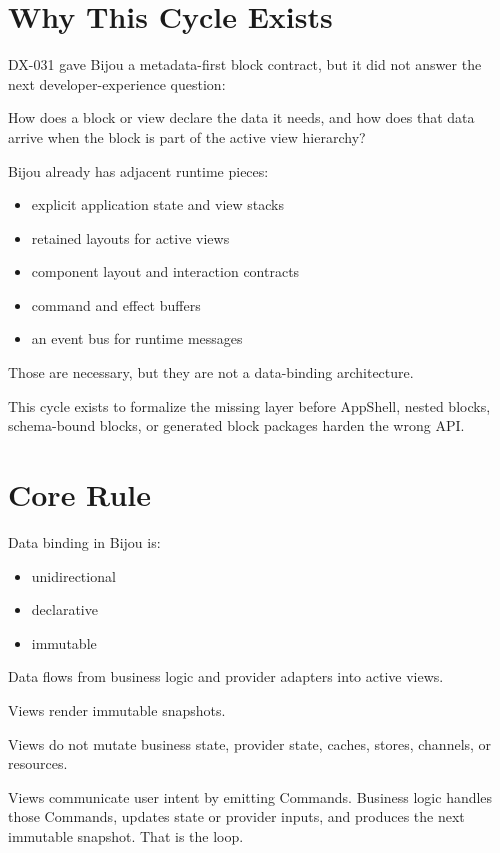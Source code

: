 \section{Why This Cycle Exists}\label{record-132-why-this-cycle-exists}

DX-031 gave Bijou a metadata-first block contract, but it did not answer the next developer-experience question:

How does a block or view declare the data it needs, and how does that data arrive when the block is part of the active view hierarchy?

Bijou already has adjacent runtime pieces:

\begin{itemize}
\tightlist
\item
  explicit application state and view stacks
\item
  retained layouts for active views
\item
  component layout and interaction contracts
\item
  command and effect buffers
\item
  an event bus for runtime messages
\end{itemize}

Those are necessary, but they are not a data-binding architecture.

This cycle exists to formalize the missing layer before AppShell, nested blocks, schema-bound blocks, or generated block packages harden the wrong API.

\section{Core Rule}\label{record-132-core-rule}

Data binding in Bijou is:

\begin{itemize}
\tightlist
\item
  unidirectional
\item
  declarative
\item
  immutable
\end{itemize}

Data flows from business logic and provider adapters into active views.

Views render immutable snapshots.

Views do not mutate business state, provider state, caches, stores, channels, or resources.

Views communicate user intent by emitting Commands. Business logic handles those Commands, updates state or provider inputs, and produces the next immutable snapshot. That is the loop.

